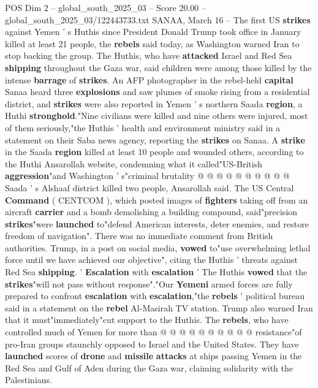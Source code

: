 \begin{textsample}{POS Dim 2 – global\_south\_2025\_03 – Score 20.00 – global\_south\_2025\_03/122443733.txt}  \label{ex:f2_pos_284}
SANAA, March 16 -- The first US \textbf{strikes} against Yemen ' s Huthis since President Donald Trump took office in January killed at least 21 people, the \textbf{rebels} said today, as Washington warned Iran to stop backing the group.
The Huthis, who have \textbf{attacked} Israel and Red Sea \textbf{shipping} throughout the Gaza war, said children were among those killed by the intense \textbf{barrage} of \textbf{strikes}.
An AFP photographer in the rebel-held \textbf{capital} Sanaa heard three \textbf{explosions} and saw plumes of smoke rising from a residential district, and \textbf{strikes} were also reported in Yemen ' s northern Saada \textbf{region}, a Huthi \textbf{stronghold}."Nine civilians were killed and nine others were injured, most of them seriously,"the Huthis ' health and environment ministry said in a statement on their Saba news agency, reporting the \textbf{strikes} on Sanaa.
A \textbf{strike} in the Saada \textbf{region} killed at least 10 people and wounded others, according to the Huthi Ansarollah website, condemning what it called"US-British \textbf{aggression}"and Washington ' s"criminal brutality @ @ @ @ @ @ @ @ @ @ Saada ' s Alshaaf district killed two people, Ansarollah said.
The US Central \textbf{Command} ( CENTCOM ), which posted images of \textbf{fighters} taking off from an aircraft \textbf{carrier} and a bomb demolishing a building compound, said"precision \textbf{strikes}"were \textbf{launched} to"defend American interests, deter enemies, and restore freedom of navigation".
There was no immediate comment from British authorities.
Trump, in a post on social media, \textbf{vowed} to"use overwhelming lethal force until we have achieved our objective", citing the Huthis ' threats against Red Sea \textbf{shipping}. ' \textbf{Escalation} with \textbf{escalation} ' The Huthis \textbf{vowed} that the \textbf{strikes}"will not pass without response"."Our \textbf{Yemeni} armed forces are fully prepared to confront \textbf{escalation} with \textbf{escalation},"the \textbf{rebels} ' political bureau said in a statement on the \textbf{rebel} Al-Masirah TV station.
Trump also warned Iran that it must"immediately"cut support to the Huthis.
The \textbf{rebels}, who have controlled much of Yemen for more than @ @ @ @ @ @ @ @ @ @ resistance"of pro-Iran groups staunchly opposed to Israel and the United States.
They have \textbf{launched} scores of \textbf{drone} and \textbf{missile} \textbf{attacks} at ships passing Yemen in the Red Sea and Gulf of Aden during the Gaza war, claiming solidarity with the Palestinians.

\end{textsample}
